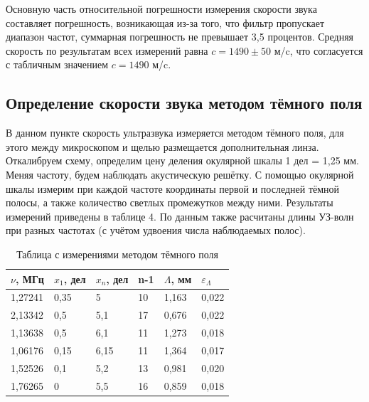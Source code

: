 \documentclass[a4paper,12pt]{article} %
\begin{document}
Основную часть относительной погрешности измерения скорости звука составляет погрешность, возникающая из-за того, что фильтр пропускает диапазон частот, суммарная погрешность не превышает 3,5 процентов. Средняя скорость по результатам всех измерений равна $c = 1490\pm 50$ м/c, что согласуется с табличным значением $c = 1490$ м/c.
\subsection{Определение скорости звука методом тёмного поля}
В данном пункте скорость ультразвука измеряется методом тёмного поля, для этого между микроскопом и щелью размещается дополнительная линза. Откалибруем схему, определим цену деления окулярной шкалы 1 дел = 1,25 мм.
\\
Меняя частоту, будем наблюдать акустическую решётку. С помощью окулярной шкалы измерим при каждой частоте координаты первой и последней тёмной полосы, а также количество светлых промежутков между ними. Результаты измерений приведены в таблице 4. По данным также расчитаны длины УЗ-волн при разных частотах (с учётом удвоения числа наблюдаемых полос).
\begin{table}[H]
\begin{tabular}{|l|l|l|l|l|l|}
\hline
$\nu$, МГц & $x_{1}$, дел & $x_{n}$, дел & n-1 & $\Lambda $, мм & $\varepsilon_{\Lambda}$ \\ \hline
1,27241                 & 0,35         & 5            & 10  & 1,163          & 0,022                  \\ \hline
2,13342                 & 0,5          & 5,1          & 17  & 0,676          & 0,022                  \\ \hline
1,13638                 & 0,5          & 6,1          & 11  & 1,273          & 0,018                  \\ \hline
1,06176                 & 0,15         & 6,15         & 11  & 1,364          & 0,017                  \\ \hline
1,52526                 & 0,1          & 5,2          & 13  & 0,981          & 0,020                  \\ \hline
1,76265                 & 0            & 5,5          & 16  & 0,859          & 0,018                  \\ \hline
\end{tabular}
\caption{Таблица с измерениями методом тёмного поля}
\end{table}
\\
\end{document}

